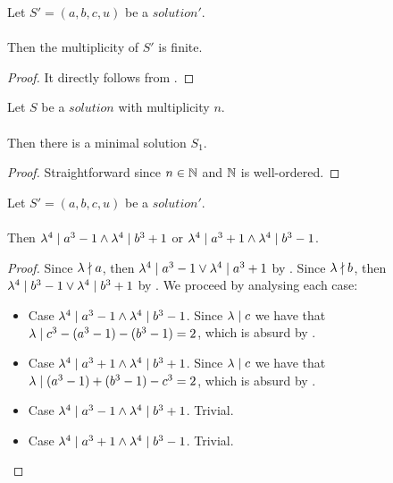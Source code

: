 \begin{lemma}
    \label{lmm:Solution1.multiplicity_lambda_c_finite}
    \leanok
    Let $S'=(a, b, c, u)$ be a $solution'$. \\\\
    Then the multiplicity of $S'$ is finite.
\end{lemma}
\begin{proof}
    \leanok
    It directly follows from .
\end{proof}

\begin{lemma}
    \label{lmm:exists_minimal}
    \leanok
    Let $S$ be a $solution$ with multiplicity $n$. \\\\
    Then there is a minimal solution $S_1$.
\end{lemma}
\begin{proof}
    \leanok
    Straightforward since $n \in \mathbb{N}$ and $\mathbb{N}$ is well-ordered.
\end{proof}

\begin{lemma}
    \label{lmm:a_cube_b_cube_same_congr}
    \leanok
    Let $S'=(a, b, c, u)$ be a $solution'$. \\\\
    Then $\lambda^4 \mid a^3 - 1 \land \lambda^4 \mid b^3 + 1$ or
    $\lambda^4 \mid a^3 + 1 \land \lambda^4 \mid b^3 - 1$.
\end{lemma}
\begin{proof}
    \leanok
    Since $\lambda \nmid a$, then
    $\lambda^4 \mid a^3 - 1 \lor \lambda^4 \mid a^3 + 1$ by
    .
    Since $\lambda \nmid b$, then
    $\lambda^4 \mid b^3 - 1 \lor \lambda^4 \mid b^3 + 1$ by
    .
    We proceed by analysing each case:
    \begin{itemize}
        \item Case $\lambda^4 \mid a^3 - 1 \land \lambda^4 \mid b^3 - 1$.
        Since $\lambda \mid c$ we have that $\lambda \mid c^3-(a^3-1)-(b^3-1) = 2$,
        which is absurd by .
        \item Case $\lambda^4 \mid a^3 + 1 \land \lambda^4 \mid b^3 + 1$.
        Since $\lambda \mid c$ we have that $\lambda \mid (a^3-1)+(b^3-1)-c^3 = 2$,
        which is absurd by .
        \item Case $\lambda^4 \mid a^3 - 1 \land \lambda^4 \mid b^3 + 1$. Trivial.
        \item Case $\lambda^4 \mid a^3 + 1 \land \lambda^4 \mid b^3 - 1$. Trivial.
    \end{itemize}
\end{proof}

